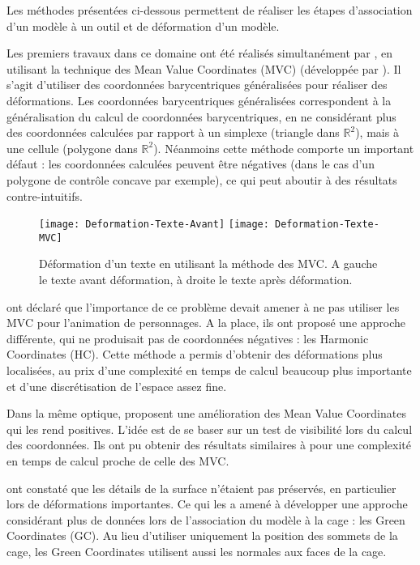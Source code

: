 Les méthodes présentées ci-dessous permettent de réaliser les étapes
d'association d'un modèle à un outil et de déformation d'un modèle.

Les premiers travaux dans ce domaine ont été réalisés simultanément par
\cite{JSW05} \cite{FKR05}, en utilisant la technique des Mean Value
Coordinates (MVC) (développée par \cite{Flo03}). Il s'agit d'utiliser des
coordonnées barycentriques généralisées pour réaliser des déformations. Les
coordonnées barycentriques généralisées correspondent à la généralisation du
calcul de coordonnées barycentriques, en ne considérant plus des coordonnées
calculées par rapport à un simplexe (triangle dans $\mathbb{R}^2$), mais à une
cellule (polygone dans $\mathbb{R}^2$). Néanmoins cette méthode comporte un
important défaut : les coordonnées calculées peuvent être négatives (dans le
cas d'un polygone de contrôle concave par exemple), ce qui peut aboutir à des
résultats contre-intuitifs.

\begin{figure}[ht]
\begin{center}
\texttt{[image: Deformation-Texte-Avant]}
\texttt{[image: Deformation-Texte-MVC]}

\caption[Déformation d'un texte (MVC)] {Déformation d'un texte en utilisant la
méthode des MVC. A gauche le texte avant déformation, à droite le texte après
déformation.}

\label{DEFMea}
\end{center}
\end{figure}

\cite{JMDGS07} ont déclaré que l'importance de ce problème devait amener à ne
pas utiliser les MVC pour l'animation de personnages. A la place, ils ont
proposé une approche différente, qui ne produisait pas de coordonnées
négatives : les Harmonic Coordinates (HC). Cette méthode a permis d'obtenir
des déformations plus localisées, au prix d'une complexité en temps de
calcul beaucoup plus importante et d'une discrétisation de l'espace assez
fine.

Dans la même optique, \cite{LKCL07} proposent une amélioration des Mean Value
Coordinates qui les rend positives. L'idée est de se baser sur un test de
visibilité lors du calcul des coordonnées. Ils ont pu obtenir des résultats
similaires à \cite{JMDGS07} pour une complexité en temps de calcul proche
de celle des MVC.

\cite{LLC08} ont constaté que les détails de la surface n'étaient pas
préservés, en particulier lors de déformations importantes. Ce qui les a amené
à développer une approche considérant plus de données lors de l'association du
modèle à la cage : les Green Coordinates (GC). Au lieu d'utiliser uniquement
la position des sommets de la cage, les Green Coordinates utilisent aussi les
normales aux faces de la cage.

